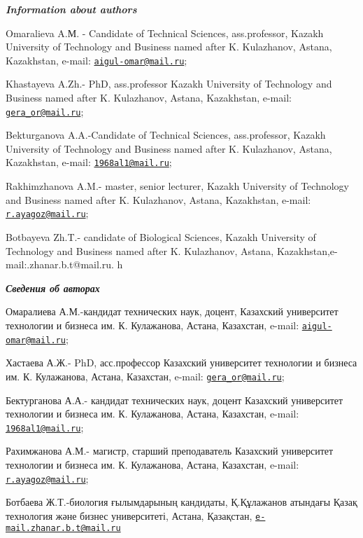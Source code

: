 \begin{authorinfo}
\emph{{\bfseries Information about authors}}

Omaralieva A.М. - Candidate of Technical Sciences, ass.professor, Kazakh
University of Technology and Business named after K. Kulazhanov, Astana,
Kazakhstan, e-mail:
\href{mailto:aigul-omar@mail.ru}{\nolinkurl{aigul-omar@mail.ru}};

Khastayeva A.Zh.- PhD, ass.professor Kazakh University of Technology and
Business named after K. Kulazhanov, Astana, Kazakhstan, e-mail:
\href{mailto:gera_or@mail.ru}{\nolinkurl{gera\_or@mail.ru}};

Bekturganova A.A.-Candidate of Technical Sciences, ass.professor, Kazakh
University of Technology and Business named after K. Kulazhanov, Astana,
Kazakhstan, e-mail:
\href{mailto:1968al1@mail.ru}{\nolinkurl{1968al1@mail.ru}};

Rakhimzhanova A.M.- master, senior lecturer, Kazakh University of
Technology and Business named after K. Kulazhanov, Astana, Kazakhstan,
e-mail: \href{mailto:r.ayagoz@mail.ru}{\nolinkurl{r.ayagoz@mail.ru}};

Botbayeva Zh.T.- candidate of Biological Sciences, Kazakh University of
Technology and Business named after K. Kulazhanov, Astana,
Kazakhstan,e-mail:.zhanar.b.t@mail.ru. h

\emph{{\bfseries Сведения об авторах}}

Омаралиева А.М.-кандидат технических наук, доцент, Казахский университет
технологии и бизнеса им. К. Кулажанова, Астана, Казахстан, e-mail:
\href{mailto:aigul-omar@mail.ru}{\nolinkurl{aigul-omar@mail.ru}};

Хастаева А.Ж.- PhD, асс.профессор Казахский университет технологии и
бизнеса им. К. Кулажанова, Астана, Казахстан, e-mail:
\href{mailto:gera_or@mail.ru}{\nolinkurl{gera\_or@mail.ru}};

Бектурганова А.А.- кандидат технических наук, доцент Казахский
университет технологии и бизнеса им. К. Кулажанова, Астана, Казахстан,
e-mail: \href{mailto:1968al1@mail.ru}{\nolinkurl{1968al1@mail.ru}};

Рахимжанова А.М.- магистр, старший преподаватель Казахский университет
технологии и бизнеса им. К. Кулажанова, Астана, Казахстан, e-mail:
\href{mailto:r.ayagoz@mail.ru}{\nolinkurl{r.ayagoz@mail.ru}};

Ботбаева Ж.Т.-биология ғылымдарының кандидаты, Қ.Құлажанов атындағы
Қазақ технология және бизнес университеті, Астана, Қазақстан,
\href{mailto:e-mail.zhanar.b.t@mail.ru}{\nolinkurl{e-mail.zhanar.b.t@mail.ru}}
\end{authorinfo}
